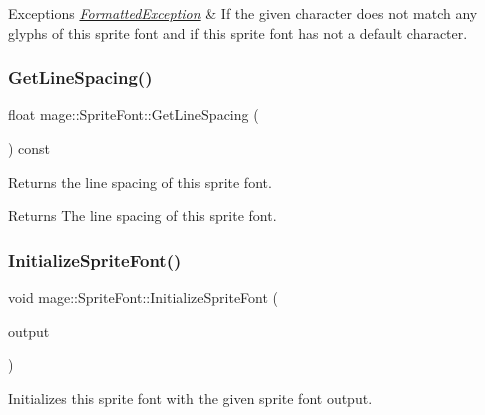 \begin{DoxyExceptions}{Exceptions}
{\em \hyperlink{structmage_1_1_formatted_exception}{Formatted\+Exception}} & If the given character does not match any glyphs of this sprite font and if this sprite font has not a default character. \\
\hline
\end{DoxyExceptions}
\hypertarget{classmage_1_1_sprite_font_ae90ee76625716c6cbce851b6fd14524b}{}\label{classmage_1_1_sprite_font_ae90ee76625716c6cbce851b6fd14524b} 
\subsubsection{\texorpdfstring{Get\+Line\+Spacing()}{GetLineSpacing()}}
{\footnotesize\ttfamily float mage\+::\+Sprite\+Font\+::\+Get\+Line\+Spacing (\begin{DoxyParamCaption}{ }\end{DoxyParamCaption}) const}

Returns the line spacing of this sprite font.

\begin{DoxyReturn}{Returns}
The line spacing of this sprite font. 
\end{DoxyReturn}
\hypertarget{classmage_1_1_sprite_font_ae0edccbf98f4bd3b3195fa602baee121}{}\label{classmage_1_1_sprite_font_ae0edccbf98f4bd3b3195fa602baee121} 
\subsubsection{\texorpdfstring{Initialize\+Sprite\+Font()}{InitializeSpriteFont()}}
{\footnotesize\ttfamily void mage\+::\+Sprite\+Font\+::\+Initialize\+Sprite\+Font (\begin{DoxyParamCaption}\item[{const \hyperlink{structmage_1_1_sprite_font_output}{Sprite\+Font\+Output} \&}]{output }\end{DoxyParamCaption})\hspace{0.3cm}{\ttfamily [private]}}

Initializes this sprite font with the given sprite font output.


